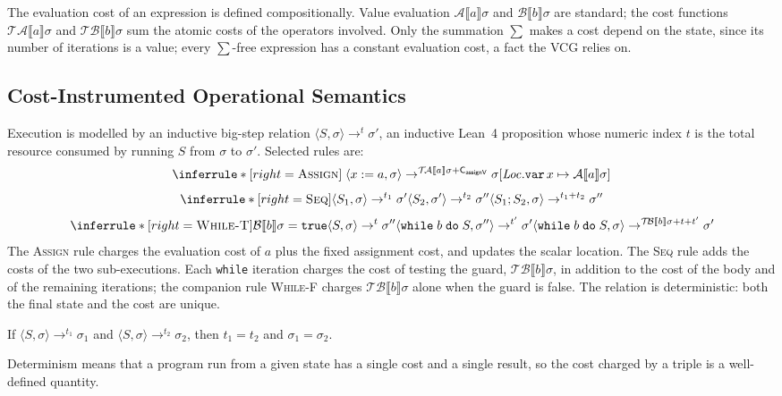\documentclass[runningheads]{llncs}
\newcommand{\Lean}{Lean~4\xspace}
\newcommand{\State}{\sigma}
\newcommand{\Loc}{\mathit{Loc}}
\newcommand{\aval}[1]{\mathcal{A}\llbracket #1 \rrbracket}
\newcommand{\bval}[1]{\mathcal{B}\llbracket #1 \rrbracket}
\newcommand{\tacost}[1]{\mathcal{T\!A}\llbracket #1 \rrbracket}
\newcommand{\tbcost}[1]{\mathcal{T\!B}\llbracket #1 \rrbracket}
\newcommand{\evals}[4]{\langle #1, #2\rangle \rightarrow^{#3} #4}
\newcommand{\upd}[3]{#1[#2 \mapsto #3]}
\newcommand{\cst}[1]{\mathsf{C_{#1}}}
\newcommand{\code}[1]{\texttt{#1}}
\begin{document}
The evaluation cost of an expression is defined compositionally.
Value evaluation $\aval{a}\State$ and $\bval{b}\State$ are standard; the cost
functions $\tacost{a}\State$ and $\tbcost{b}\State$ sum the atomic costs of the
operators involved.
Only the summation $\sum$ makes a cost depend on the state, since its number of
iterations is a value; every $\sum$-free expression has a constant evaluation
cost, a fact the VCG relies on.

\subsection{Cost-Instrumented Operational Semantics}

Execution is modelled by an inductive big-step relation
$\evals{S}{\State}{t}{\State'}$, an inductive \Lean{} proposition whose numeric
index $t$ is the total resource consumed by running $S$ from $\State$ to
$\State'$.
Selected rules are:
\[
\inferrule*[right=\textsc{Assign}]{\;}
{\evals{x := a}{\State}{\tacost{a}\State + \cst{assignV}}
{\upd{\State}{\Loc.\code{var}\,x}{\aval{a}\State}}}
\]
\[
\inferrule*[right=\textsc{Seq}]
{\evals{S_1}{\State}{t_1}{\State'}
\\ \evals{S_2}{\State'}{t_2}{\State''}}
{\evals{S_1;S_2}{\State}{t_1+t_2}{\State''}}
\]
\[
\inferrule*[right=\textsc{While-T}]
{\bval{b}\State = \code{true} \\ \evals{S}{\State}{t}{\State''} \\
\evals{\code{while}\;b\;\code{do}\;S}{\State''}{t'}{\State'}}
{\evals{\code{while}\;b\;\code{do}\;S}{\State}
{\tbcost{b}\State + t + t'}{\State'}}
\]
The \textsc{Assign} rule charges the evaluation cost of $a$ plus the fixed
assignment cost, and updates the scalar location.
The \textsc{Seq} rule adds the costs of the two sub-executions.
Each \code{while} iteration charges the cost of testing the guard,
$\tbcost{b}\State$, in addition to the cost of the body and of the remaining
iterations; the companion rule \textsc{While-F} charges $\tbcost{b}\State$ alone
when the guard is false.
The relation is deterministic: both the final state and the cost are unique.

\begin{lemma}[\code{Eval.deterministic}]\label{lem:det}
If $\evals{S}{\State}{t_1}{\State_1}$ and
$\evals{S}{\State}{t_2}{\State_2}$,
then $t_1 = t_2$ and $\State_1 = \State_2$.
\end{lemma}
Determinism means that a program run from a given state has a single cost and a
single result, so the cost charged by a triple is a well-defined quantity.
\end{document}
